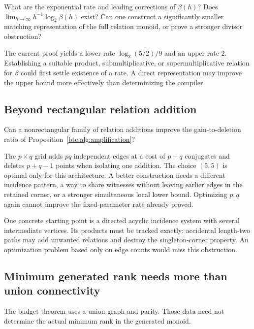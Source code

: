\begin{question}
What are the exponential rate and leading corrections of $\beta(h)$?
Does $\lim_{h\to\infty}h^{-1}\log_2\beta(h)$ exist?
Can one construct a significantly smaller matching representation
of the full relation monoid, or prove a stronger divisor obstruction?
\end{question}

The current proof yields a lower rate $\log_2(5/2)/9$ and an
upper rate $2$. Establishing a suitable product, submultiplicative,
or supermultiplicative relation for $\beta$ could first settle
existence of a rate. A direct representation may improve the
upper bound more effectively than determinizing the compiler.

\subsection{Beyond rectangular relation addition}

\begin{question}
Can a nonrectangular family of relation additions improve the
gain-to-deletion ratio of Proposition~\ref{btc:alg:amplification}?
\end{question}

The $p\times q$ grid adds $pq$ independent edges at a cost of
$p+q$ conjugates and deletes $p+q-1$ points when isolating one
addition. The choice $(5,5)$ is optimal only for this architecture.
A better construction needs a different incidence pattern,
a way to share witnesses without leaving earlier edges in the
retained corner, or a stronger simultaneous local lower bound.
Optimizing $p,q$ again cannot improve the fixed-parameter rate
already proved.

One concrete starting point is a directed acyclic incidence
system with several intermediate vertices. Its products must
be tracked exactly: accidental length-two paths may add
unwanted relations and destroy the singleton-corner property.
An optimization problem based only on edge counts would miss
this obstruction.

\subsection{Minimum generated rank needs more than union connectivity}
\label{btc:research:union}

The budget theorem uses a union graph and parity. Those data
need not determine the actual minimum rank in the generated
monoid.

